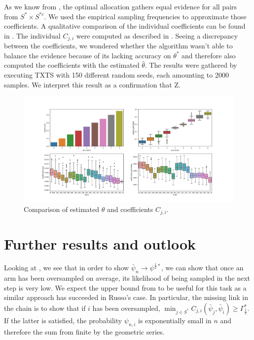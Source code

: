 As we know from , the optimal allocation
gathers equal evidence for all pairs from $S^* \times S^{*c}$. We used the
empirical sampling frequencies to approximate those coefficients. A qualitative
comparison of the individual coefficients can be found in
. The individual $C_{j, i}$ were computed as
described in . Seeing a discrepancy
between the coefficients, we wondered whether the algorithm wasn't able to
balance the evidence because of its lacking accuracy on $\theta^*$ and therefore
also computed the coefficients with the estimated $\hat{\theta}$. The results
were gathered by executing TXTS with 150 different random seeds, each amounting to 2000 samples. We interpret this result as a confirmation that Z.
\begin{figure}[h]
  \centering
  \includegraphics[width=\textwidth]{190909-coefficients_2000.png}
  \caption{Comparison of estimated $\theta$ and coefficients $C_{j, i}$.}
  \label{fig:algorithm_coefficients}
\end{figure}

\section{Further results and outlook}\label{section:further_results}

Looking at , we see that in
order to show $\bar{\psi}_n \rightarrow \psi^{\frac{1}{2}*}$, we can show
that once an arm has been oversampled on average, its likelihood of being
sampled in the next step is very low. We expect the upper bound from
 to be useful for this task as a similar approach has
succeeded in Russo's case. In particular, the missing link in the chain is to
show that if $i$ has been oversampled, $\min_{j \in S^*} C_{j,
i}(\bar{\psi}_j, \bar{\psi}_i) \geq \Gamma^*_{\frac{1}{2}}$. If the latter is
satisfied, the probability $\psi_{n, i}$ is exponentially small in $n$ and
therefore the sum from  finite
by the geometric series.

